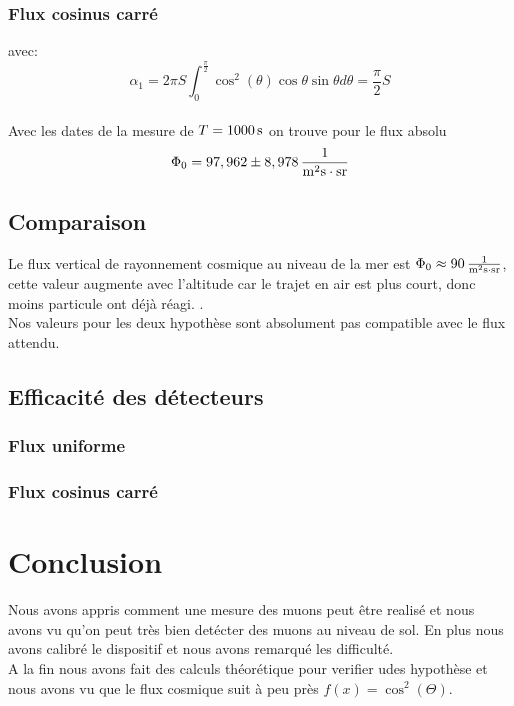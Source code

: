 \documentclass[a4paper,11pt,liststotocnumbered,bibtotocnumbered]{scrartcl}
\begin{document}
    

   \subsubsection{Flux cosinus carré}
avec:\\
\begin{equation*}
\alpha_1=2\pi S\int_0^{\frac{\pi}{2}}\cos^2(\theta)\cos\theta \sin\theta d \theta=\frac{\pi}{2} S
\end{equation*}\\
Avec les dates de la mesure de $T=\unit[1000]{s}$ on trouve pour le flux absolu
    \begin{equation*}
     \Phi_0=\unit[97,962\pm8,978]{\frac{1}{m^2s\cdot sr}} 
    \end{equation*}

   
   \subsection{Comparaison}
    Le flux vertical de rayonnement cosmique au niveau de la mer est $\Phi_0\approx\unit[90]{\frac{1}{m^2s\cdot sr}} $, cette valeur augmente avec l'altitude car le trajet en air est plus court, donc moins particule ont déjà réagi. .\\
    Nos valeurs pour les deux hypothèse sont absolument pas compatible avec le flux attendu.

   \subsection{Efficacité des détecteurs}
    \subsubsection{Flux uniforme}

    \subsubsection{Flux cosinus carré} 


    

 \section{Conclusion}
  Nous avons appris comment une mesure des muons peut être realisé et nous avons vu qu'on peut très bien detécter des muons au niveau de sol. En plus nous avons calibré le dispositif et nous avons remarqué les difficulté. \\
  A la fin nous avons fait des calculs théorétique pour verifier udes hypothèse et nous avons vu que le flux cosmique suit à peu près $f(x)=\cos^2(\Theta)$.
 
 
 \begin{appendix}
  
    

  \listoffigures  
 \end{appendix}
\end{document}
